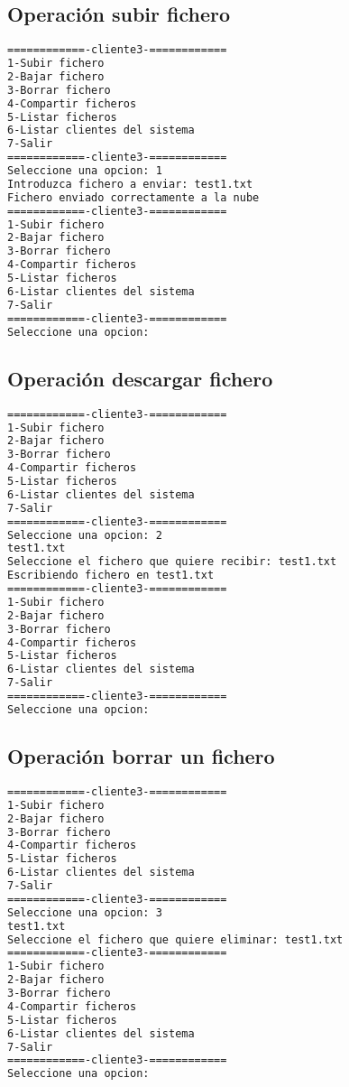 \subsection{Operación subir fichero}
\begin{lstlisting}[language=bash,frame=single,texcl=true,basicstyle=\small]
============-cliente3-============
1-Subir fichero
2-Bajar fichero
3-Borrar fichero
4-Compartir ficheros
5-Listar ficheros
6-Listar clientes del sistema
7-Salir
============-cliente3-============
Seleccione una opcion: 1
Introduzca fichero a enviar: test1.txt
Fichero enviado correctamente a la nube
============-cliente3-============
1-Subir fichero
2-Bajar fichero
3-Borrar fichero
4-Compartir ficheros
5-Listar ficheros
6-Listar clientes del sistema
7-Salir
============-cliente3-============
Seleccione una opcion:
\end{lstlisting}
\subsection{Operación descargar fichero}
\begin{lstlisting}[language=bash,frame=single,texcl=true,basicstyle=\small]
============-cliente3-============
1-Subir fichero
2-Bajar fichero
3-Borrar fichero
4-Compartir ficheros
5-Listar ficheros
6-Listar clientes del sistema
7-Salir
============-cliente3-============
Seleccione una opcion: 2
test1.txt 
Seleccione el fichero que quiere recibir: test1.txt
Escribiendo fichero en test1.txt
============-cliente3-============
1-Subir fichero
2-Bajar fichero
3-Borrar fichero
4-Compartir ficheros
5-Listar ficheros
6-Listar clientes del sistema
7-Salir
============-cliente3-============
Seleccione una opcion: 
\end{lstlisting}
\subsection{Operación borrar un fichero}
\begin{lstlisting}[language=bash,frame=single,texcl=true,basicstyle=\small]
============-cliente3-============
1-Subir fichero
2-Bajar fichero
3-Borrar fichero
4-Compartir ficheros
5-Listar ficheros
6-Listar clientes del sistema
7-Salir
============-cliente3-============
Seleccione una opcion: 3
test1.txt 
Seleccione el fichero que quiere eliminar: test1.txt
============-cliente3-============
1-Subir fichero
2-Bajar fichero
3-Borrar fichero
4-Compartir ficheros
5-Listar ficheros
6-Listar clientes del sistema
7-Salir
============-cliente3-============
Seleccione una opcion:
\end{lstlisting}
